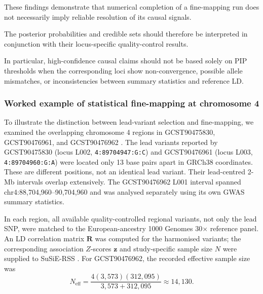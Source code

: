 \documentclass[11pt,a4paper]{article}
\begin{document}
These findings demonstrate that numerical completion
of a fine-mapping run does not necessarily imply
reliable resolution of its causal signals.

The posterior probabilities and credible sets should
therefore be interpreted in conjunction with their
locus-specific quality-control results.

In particular, high-confidence causal claims should
not be based solely on PIP thresholds when the
corresponding loci show non-convergence, possible
allele mismatches, or inconsistencies between
summary statistics and reference LD.

\subsubsection{Worked example of statistical fine-mapping at chromosome 4}
\label{subsec:finemap_worked_chr4}

To illustrate the distinction between lead-variant selection and
fine-mapping, we examined the overlapping chromosome 4 regions in
GCST90475830, GCST90476961, and GCST90476962
\cite{Verma2024}. The lead variants reported by GCST90475830
(locus L002, \texttt{4:89704947:G:C}) and GCST90476961
(locus L003, \texttt{4:89704960:G:A}) were located only 13 base pairs
apart in GRCh38 coordinates. These are different positions, not an
identical lead variant. Their lead-centred 2-Mb intervals overlap
extensively. The GCST90476962 L001 interval spanned
chr4:88,704,960--90,704,960 and was analysed separately using its
own GWAS summary statistics.

In each region, all available quality-controlled regional variants,
not only the lead SNP, were matched to the European-ancestry 1000
Genomes 30$\times$ reference panel. An LD correlation matrix $\mathbf R$
was computed for the harmonised variants; the corresponding association
$Z$-scores $\mathbf z$ and study-specific sample size $N$ were supplied
to SuSiE-RSS \cite{Zou2022}. For GCST90476962, the recorded effective
sample size was
\begin{equation}
N_{\mathrm{eff}} =
\frac{4(3,573)(312,095)}{3,573+312,095}
\approx 14,130.
\end{equation}
\end{document}

